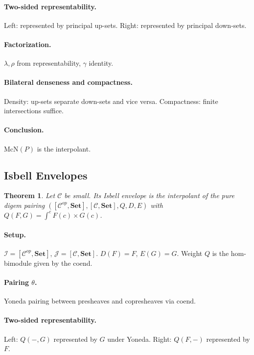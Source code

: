\documentclass[11pt]{article}
\theoremstyle{plain}
\newtheorem{theorem}{Theorem}[section]
\theoremstyle{definition}
\theoremstyle{remark}
\begin{document}
\paragraph{Two-sided representability.}
Left: represented by principal up-sets.  
Right: represented by principal down-sets.

\paragraph{Factorization.}
$\lambda,\rho$ from representability, $\gamma$ identity.

\paragraph{Bilateral denseness and compactness.}
Density: up-sets separate down-sets and vice versa.  
Compactness: finite intersections suffice.

\paragraph{Conclusion.}
$\mathrm{McN}(P)$ is the interpolant.

\subsection{Isbell Envelopes}
\begin{theorem}
Let $\mathcal{C}$ be small. Its Isbell envelope is the interpolant of the pure digem pairing $([\mathcal{C}^{op},\mathbf{Set}],[\mathcal{C},\mathbf{Set}],Q,D,E)$ with $Q(F,G) = \int^{c} F(c)\times G(c)$.
\end{theorem}

\paragraph{Setup.}
$\mathcal{I}=[\mathcal{C}^{op},\mathbf{Set}]$, $\mathcal{J}=[\mathcal{C},\mathbf{Set}]$.  
$D(F)=F$, $E(G)=G$. Weight $Q$ is the hom-bimodule given by the coend.

\paragraph{Pairing $\theta$.}
Yoneda pairing between presheaves and copresheaves via coend.

\paragraph{Two-sided representability.}
Left: $Q(-,G)$ represented by $G$ under Yoneda.  
Right: $Q(F,-)$ represented by $F$.
\end{document}
